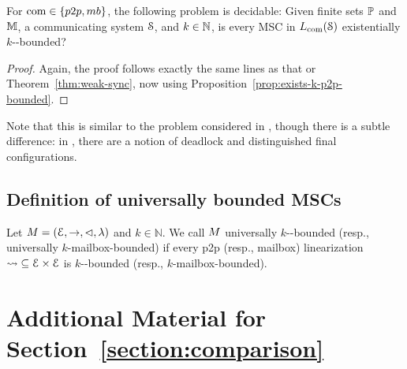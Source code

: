 \documentclass[a4paper,UKenglish,cleveref, autoref, thm-restate]{lipics-v2021}
\begin{document}
%
 \begin{theorem}\label{thm:exists-sync}
 For $\comsymb \in \{\ppsymb, \mbsymb\}$, the following problem is decidable:
 Given finite sets $\mathbb{P}$ and $\mathbb{M}$, a communicating system $\mathcal{S}$, and $k \in \mathbb{N}$,
 is every MSC in $L_{\textup{com}}(\mathcal{S})$ existentially $k$-\pp-bounded?
 \end{theorem}

 \begin{proof}
 Again, the proof follows exactly the same lines as that or Theorem~\ref{thm:weak-sync},
 now using Proposition~\ref{prop:exists-k-p2p-bounded}.
 \end{proof}
%
 Note that this is similar to the problem considered
 in \cite{GKM07,kuske2014communicating},
 though there is a subtle difference: in \cite{GKM07,kuske2014communicating},
 there are a notion of deadlock and distinguished final configurations.

\subsection{Definition of universally bounded MSCs}\label{appendix:universally}
\begin{definition}
	Let $M = (\mathcal{E}, \rightarrow, \lhd, \lambda)$ and $k \in \mathbb{N}$. We call $M$ universally $k$-\pp-bounded (resp., universally $k$-mailbox-bounded) if every p2p (resp., mailbox) linearization ${\rightsquigarrow} \subseteq \mathcal{E} \times \mathcal{E}$
is $k$-\pp-bounded (resp., $k$-mailbox-bounded).
\end{definition}




\section{Additional Material for Section~\ref{section:comparison}}\label{appendix:comparison}


\end{document}
